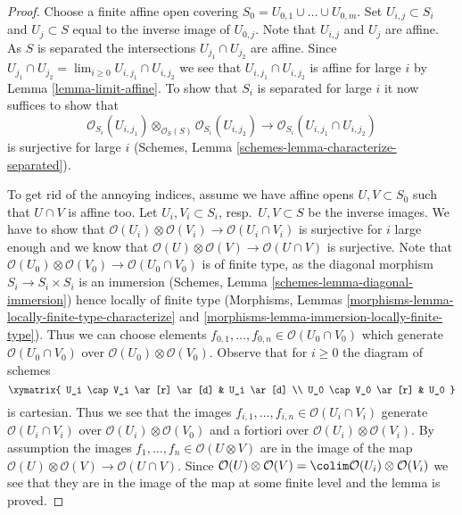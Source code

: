 \begin{proof}
Choose a finite affine open covering
$S_0 = U_{0, 1} \cup \ldots \cup U_{0, m}$.
Set $U_{i, j} \subset S_i$ and $U_j \subset S$
equal to the inverse image of $U_{0, j}$.
Note that $U_{i, j}$ and $U_j$ are affine. As $S$ is separated
the intersections $U_{j_1} \cap U_{j_2}$ are affine. Since
$U_{j_1} \cap U_{j_2} = \lim_{i \geq 0} U_{i, j_1} \cap U_{i, j_2}$
we see that $U_{i, j_1} \cap U_{i, j_2}$ is affine for large $i$
by Lemma \ref{lemma-limit-affine}. To show that $S_i$ is separated
for large $i$ it now suffices to show that
$$
\mathcal{O}_{S_i}(U_{i, j_1})
\otimes_{\mathcal{O}_S(S)}
\mathcal{O}_{S_i}(U_{i, j_2})
\longrightarrow
\mathcal{O}_{S_i}(U_{i, j_1} \cap U_{i, j_2})
$$
is surjective for large $i$
(Schemes, Lemma \ref{schemes-lemma-characterize-separated}).

\medskip\noindent
To get rid of the annoying indices, assume we have affine opens
$U, V \subset S_0$ such that $U \cap V$ is affine too.
Let $U_i, V_i \subset S_i$, resp.\ $U, V \subset S$ be the inverse images.
We have to show that
$\mathcal{O}(U_i) \otimes \mathcal{O}(V_i) \to
\mathcal{O}(U_i \cap V_i)$
is surjective for $i$ large enough and we know that
$\mathcal{O}(U) \otimes \mathcal{O}(V) \to \mathcal{O}(U \cap V)$
is surjective. Note that
$\mathcal{O}(U_0) \otimes \mathcal{O}(V_0) \to
\mathcal{O}(U_0 \cap V_0)$
is of finite type, as the diagonal morphism $S_i \to S_i \times S_i$
is an immersion (Schemes, Lemma \ref{schemes-lemma-diagonal-immersion})
hence locally of finite type
(Morphisms, Lemmas \ref{morphisms-lemma-locally-finite-type-characterize} and
\ref{morphisms-lemma-immersion-locally-finite-type}).
Thus we can choose elements
$f_{0, 1}, \ldots, f_{0, n} \in \mathcal{O}(U_0 \cap V_0)$
which generate $\mathcal{O}(U_0 \cap V_0)$ over
$\mathcal{O}(U_0) \otimes \mathcal{O}(V_0)$.
Observe that for $i \geq 0$ the diagram of schemes
$$
\xymatrix{
U_i \cap V_i \ar[r] \ar[d] & U_i \ar[d] \\
U_0 \cap V_0 \ar[r] & U_0
}
$$
is cartesian. Thus we see that the images
$f_{i, 1}, \ldots, f_{i, n} \in \mathcal{O}(U_i \cap V_i)$
generate $\mathcal{O}(U_i \cap V_i)$ over
$\mathcal{O}(U_i) \otimes \mathcal{O}(V_0)$
and a fortiori over
$\mathcal{O}(U_i) \otimes \mathcal{O}(V_i)$.
By assumption the images $f_1, \ldots, f_n \in \mathcal{O}(U \otimes V)$
are in the image of the map
$\mathcal{O}(U) \otimes \mathcal{O}(V) \to \mathcal{O}(U \cap V)$.
Since
$\mathcal{O}(U) \otimes \mathcal{O}(V) =
\colim \mathcal{O}(U_i) \otimes \mathcal{O}(V_i)$
we see that they are in the image of the map at some finite level
and the lemma is proved.
\end{proof}

